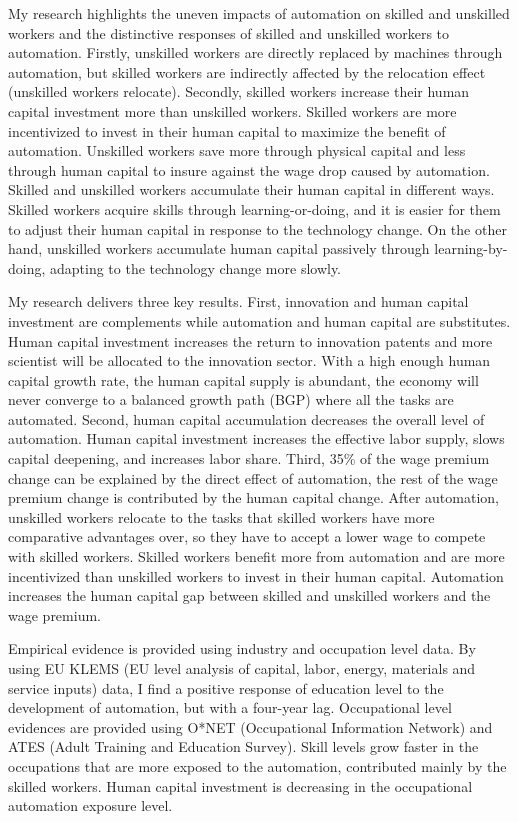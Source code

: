 \documentclass[12pt]{article}
\begin{document}
My research highlights the uneven impacts of automation on skilled and unskilled workers and the distinctive responses of skilled and unskilled workers to automation. Firstly, unskilled workers are directly replaced by machines through automation, but skilled workers are indirectly affected by the relocation effect (unskilled workers relocate). Secondly, skilled workers increase their human capital investment more than unskilled workers. Skilled workers are more incentivized to invest in their human capital to maximize the benefit of automation. Unskilled workers save more through physical capital and less through human capital to insure against the wage drop caused by automation. Skilled and unskilled workers accumulate their human capital in different ways. Skilled workers acquire skills through learning-or-doing, and it is easier for them to adjust their human capital in response to the technology change. On the other hand, unskilled workers accumulate human capital passively through learning-by-doing, adapting to the technology change more slowly.  

My research delivers three key results. First, innovation and human capital investment are complements while automation and human capital are substitutes. Human capital investment increases the return to innovation patents and more scientist will be allocated to the innovation sector. With a high enough human capital growth rate, the human capital supply is abundant, the economy will never converge to a balanced growth path (BGP) where all the tasks are automated. Second, human capital accumulation decreases the overall level of automation. Human capital investment increases the effective labor supply, slows capital deepening, and increases labor share. Third, 35\% of the wage premium change can be explained by the direct effect of automation, the rest of the wage premium change is contributed by the human capital change. After automation, unskilled workers relocate to the tasks that skilled workers have more comparative advantages over, so they have to accept a lower wage to compete with skilled workers. Skilled workers benefit more from automation and are more incentivized than unskilled workers to invest in their human capital. Automation increases the human capital gap between skilled and unskilled workers and the wage premium. 

Empirical evidence is provided using  industry and occupation level data. By using EU KLEMS (EU level analysis of capital, labor, energy, materials and service inputs) data, I find a positive response of education level to the development of automation, but with a four-year lag. Occupational level evidences are provided using O*NET (Occupational Information Network) and ATES (Adult Training and Education Survey). Skill levels grow faster in the occupations that are more exposed to the automation, contributed mainly by the skilled workers. Human capital investment is decreasing in the occupational automation exposure level. 
\end{document}
